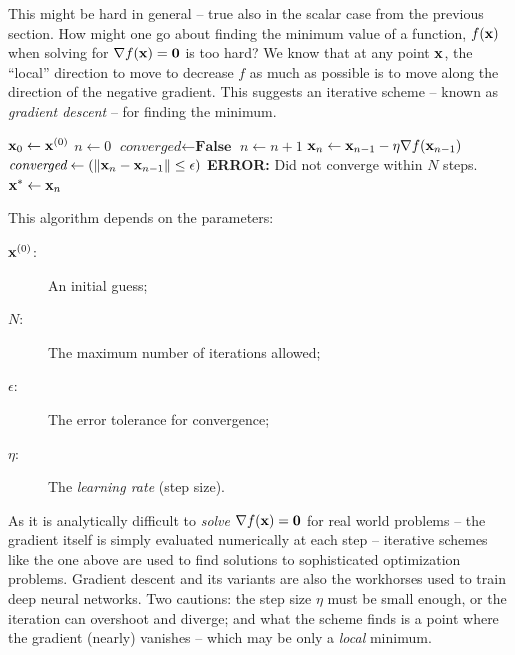 \documentclass{article}
\begin{document}
This might be hard in general -- true also in the scalar case from the previous
section.
How might one go about finding the minimum value of a function, $f({\bf x})$
when solving for $\nabla f({\bf x}) = {\bf 0}$ is too hard?
We know that at any point ${\bf x}$, the ``local''{} direction to move to decrease $f$
as much as possible is to move along the direction of the negative gradient.
This suggests an iterative scheme -- known as {\em gradient descent\/} --
for finding the minimum.
\begin{algorithmic}
  \STATE ${\bf x}_0 \leftarrow {\bf x}^{(0)}$
  \STATE $n \leftarrow 0$
  \STATE $\textit{converged} \leftarrow \textbf{False}$
    \STATE $n \leftarrow n + 1$
    \STATE ${\bf x}_n \leftarrow {\bf x}_{n-1} - \eta \nabla f({\bf x}_{n-1})$
    \STATE $\textit{converged} \leftarrow (\|{\bf x}_n - {\bf x}_{n-1}\| \le \epsilon)$
  \ENDWHILE
    \vspace{1em}
    \STATE \textbf{ERROR:} Did not converge within $N$ steps.
  \ELSE
    \STATE ${\bf x}^* \leftarrow {\bf x}_n$
  \ENDIF
\end{algorithmic}

This algorithm depends on the parameters: 
\begin{description}
    \item[${\bf x}^{(0)}$:] An initial guess;
    \item[$N$:] The maximum number of iterations allowed;
    \item[$\epsilon$:] The error tolerance for convergence;
    \item[$\eta$:] The {\em learning rate\/} (step size).
\end{description}
As it is analytically difficult to {\em solve\/} $\nabla f({\bf x}) = {\bf 0}$
for real world problems -- the gradient itself is simply evaluated
numerically at each step -- iterative schemes like the one above are used
to find solutions to sophisticated optimization problems.
Gradient descent and its variants are also the workhorses used to train
deep neural networks.
Two cautions: the step size $\eta$ must be small enough, or the iteration
can overshoot and diverge; and what the scheme finds is a point where the
gradient (nearly) vanishes -- which may be only a {\em local\/} minimum.
\end{document}
